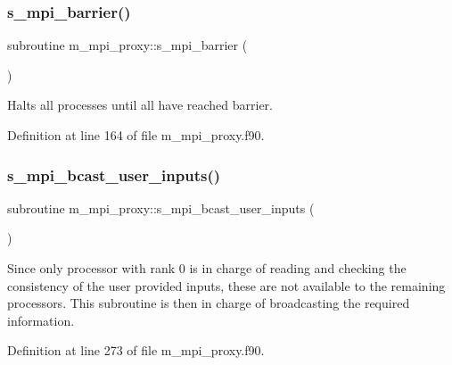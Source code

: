 \subsubsection{\texorpdfstring{s\+\_\+mpi\+\_\+barrier()}{s\_mpi\_barrier()}}
{\footnotesize\ttfamily subroutine m\+\_\+mpi\+\_\+proxy\+::s\+\_\+mpi\+\_\+barrier (\begin{DoxyParamCaption}{ }\end{DoxyParamCaption})}



Halts all processes until all have reached barrier. 



Definition at line 164 of file m\+\_\+mpi\+\_\+proxy.\+f90.

\mbox{\label{namespacem__mpi__proxy_a69660c5fe9302a8c0496b622fa3b5286}} 
\subsubsection{\texorpdfstring{s\+\_\+mpi\+\_\+bcast\+\_\+user\+\_\+inputs()}{s\_mpi\_bcast\_user\_inputs()}}
{\footnotesize\ttfamily subroutine m\+\_\+mpi\+\_\+proxy\+::s\+\_\+mpi\+\_\+bcast\+\_\+user\+\_\+inputs (\begin{DoxyParamCaption}{ }\end{DoxyParamCaption})}



Since only processor with rank 0 is in charge of reading and checking the consistency of the user provided inputs, these are not available to the remaining processors. This subroutine is then in charge of broadcasting the required information. 



Definition at line 273 of file m\+\_\+mpi\+\_\+proxy.\+f90.

\mbox{\label{namespacem__mpi__proxy_a80c5e235786545276fe6ffa06965017f}} 
